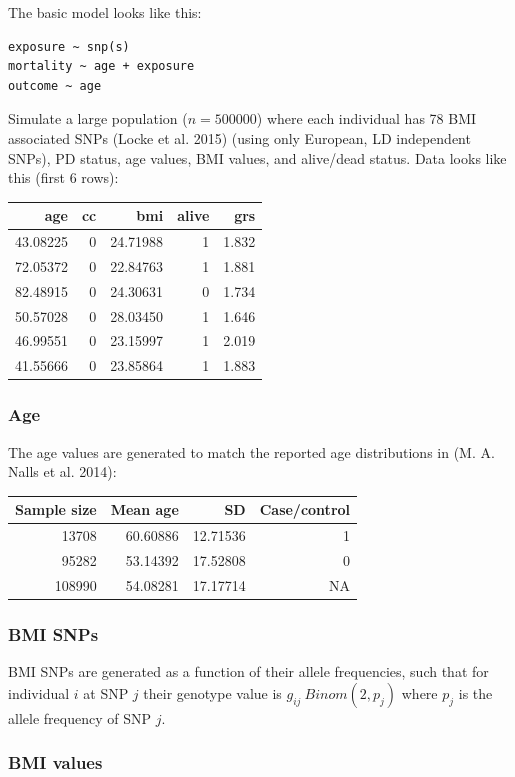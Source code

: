 \documentclass[]{article}
\begin{document}
The basic model looks like this:

\begin{verbatim}
exposure ~ snp(s)
mortality ~ age + exposure
outcome ~ age
\end{verbatim}

Simulate a large population (\(n=500000\)) where each individual has 78
BMI associated SNPs (Locke et al. 2015) (using only European, LD
independent SNPs), PD status, age values, BMI values, and alive/dead
status. Data looks like this (first 6 rows):

\begin{longtable}[c]{@{}rrrrr@{}}
\toprule
age & cc & bmi & alive & grs\tabularnewline
\midrule
\endhead
43.08225 & 0 & 24.71988 & 1 & 1.832\tabularnewline
72.05372 & 0 & 22.84763 & 1 & 1.881\tabularnewline
82.48915 & 0 & 24.30631 & 0 & 1.734\tabularnewline
50.57028 & 0 & 28.03450 & 1 & 1.646\tabularnewline
46.99551 & 0 & 23.15997 & 1 & 2.019\tabularnewline
41.55666 & 0 & 23.85864 & 1 & 1.883\tabularnewline
\bottomrule
\end{longtable}

\subsubsection{Age}\label{age}

The age values are generated to match the reported age distributions in
(M. A. Nalls et al. 2014):

\begin{longtable}[c]{@{}rrrr@{}}
\toprule
Sample size & Mean age & SD & Case/control\tabularnewline
\midrule
\endhead
13708 & 60.60886 & 12.71536 & 1\tabularnewline
95282 & 53.14392 & 17.52808 & 0\tabularnewline
108990 & 54.08281 & 17.17714 & NA\tabularnewline
\bottomrule
\end{longtable}

\subsubsection{BMI SNPs}\label{bmi-snps}

BMI SNPs are generated as a function of their allele frequencies, such
that for individual \(i\) at SNP \(j\) their genotype value is
\(g_{ij} ~ Binom(2, p_{j})\) where \(p_{j}\) is the allele frequency of
SNP \(j\).

\subsubsection{BMI values}\label{bmi-values}
\end{document}
